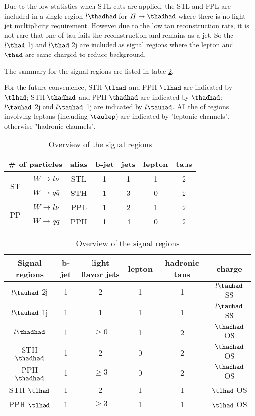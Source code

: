 Due to the low statistics when STL cuts are applied, the STL and PPL are included in a single region $l\thadhad$ for $H\to\thadhad$ where there is no light jet multiplicity requirement. However due to the low tau reconstruction rate, it is not rare that one of tau fails the reconstruction and remains as a jet. So the $l\thad$ 1j and $l\thad$ 2j are included as signal regions where the lepton and $\thad$ are same charged to reduce background.

The summary for the signal regions are listed in table \ref{tab:signalregions}.

For the future convenience, STH $\tlhad$ and PPH $\tlhad$ are indicated by $\tlhad$; STH $\thadhad$ and PPH $\thadhad$ are indicated by $\thadhad$; $l\tauhad$ 2j and $l\tauhad$ 1j are indicated by $l\tauhad$. All the of regions involving leptons (including $\taulep$) are indicated by "leptonic channels", otherwise "hadronic channels".

\begin{table}
\footnotesize
\centering
\caption{Overview of the final states of signal events}
\label{tab:signalevents}
\begin{tabular}[h]{c|c|c|c|c|c|c}
\hline \hline

\multicolumn{2}{c|}{\# of particles}	& alias & b-jet & jets & lepton & taus\\ \hline
\multirow{2}{*}{ST}	& $W\to l\nu$		& STL   & 1	    & 1    & 1      & 2   \\ \cline{2-7}
					& $W\to q\bar{q}$	& STH   & 1	    & 3    & 0      & 2   \\ \hline
\multirow{2}{*}{PP}	& $W\to l\nu$		& PPL   & 1	    & 2    & 1      & 2   \\ \cline{2-7}
					& $W\to q\bar{q}$	& PPH   & 1	    & 4    & 0      & 2   \\ \hline
\end{tabular}
\footnotesize
\centering
\caption{Overview of the signal regions}
\label{tab:signalregions}
\begin{tabular}[h]{c|c|c|c|c|c}
\hline \hline
Signal regions & b-jet & light flavor jets	& lepton & hadronic taus & charge\\ \hline
$l\tauhad$ 2j  & 1     & 2					& 1      & 1			 & $l\tauhad$ SS\\ \hline
$l\tauhad$ 1j  & 1     & 1					& 1      & 1			 & $l\tauhad$ SS\\ \hline
$l\thadhad$	   & 1     & $\ge0$ 			& 1      & 2             & $\thadhad$ OS\\ \hline
STH $\thadhad$ & 1     & 2      			& 0      & 2             & $\thadhad$ OS\\ \hline
PPH $\thadhad$ & 1     & $\ge3$ 			& 0      & 2             & $\thadhad$ OS\\ \hline
STH $\tlhad$   & 1     & 2      			& 1      & 1             & $\tlhad$ OS\\ \hline
PPH $\tlhad$   & 1     & $\ge3$ 			& 1      & 1             & $\tlhad$ OS\\ \hline
\end{tabular}
\end{table}

